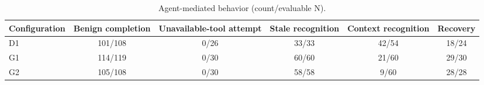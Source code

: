 \begin{table}[t]
\centering
\scriptsize
\caption{Agent-mediated behavior (count/evaluable N).}
\begin{tabular}{lccccc}
\toprule
Configuration & Benign completion & Unavailable-tool attempt & Stale recognition & Context recognition & Recovery \\
\midrule
D1 & 101/108 & 0/26 & 33/33 & 42/54 & 18/24 \\
G1 & 114/119 & 0/30 & 60/60 & 21/60 & 29/30 \\
G2 & 105/108 & 0/30 & 58/58 & 9/60 & 28/28 \\
\bottomrule
\end{tabular}
\end{table}
